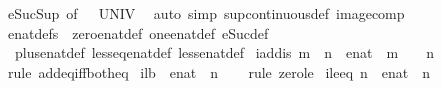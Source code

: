 \begin{isabellebody}
\ eSuc{\isacharunderscore}Sup\ {\isacharbrackleft}of\ {\isachardoublequoteopen}{\isacharunderscore}\ {\isacharbackquote}\ UNIV{\isachardoublequoteclose}{\isacharbrackright}\ \isamarkupfalse%
\ {\isacharparenleft}auto\ simp{\isacharcolon}\ sup{\isacharunderscore}continuous{\isacharunderscore}def\ image{\isacharunderscore}comp{\isacharparenright}%
\endisatagproof
{\isafoldproof}%
%
\isadelimproof
%
\endisadelimproof
%
\isadelimdocument
%
\endisadelimdocument
%
\isatagdocument
%
\isamarkuptrue%
%
\endisatagdocument
{\isafolddocument}%
%
\isadelimdocument
%
\endisadelimdocument
{}\isamarkupfalse%
\ enat{\isacharunderscore}defs\ {\isacharequal}\ zero{\isacharunderscore}enat{\isacharunderscore}def\ one{\isacharunderscore}enat{\isacharunderscore}def\ eSuc{\isacharunderscore}def\isanewline
\ \ plus{\isacharunderscore}enat{\isacharunderscore}def\ less{\isacharunderscore}eq{\isacharunderscore}enat{\isacharunderscore}def\ less{\isacharunderscore}enat{\isacharunderscore}def\isanewline
\isanewline
{}\isamarkupfalse%
\ iadd{\isacharunderscore}is{\isacharunderscore}{}{\isacharcolon}\ {\isachardoublequoteopen}{\isacharparenleft}m\ {\isacharplus}\ n\ {\isacharequal}\ {\isacharparenleft}{}{\isacharcolon}{\isacharcolon}enat{\isacharparenright}{\isacharparenright}\ {\isacharequal}\ {\isacharparenleft}m\ {\isacharequal}\ {}\ {\isasymand}\ n\ {\isacharequal}\ {}{\isacharparenright}{\isachardoublequoteclose}\isanewline
%
\isadelimproof
\ \ %
\endisadelimproof
%
\isatagproof
{}\isamarkupfalse%
\ {\isacharparenleft}rule\ add{\isacharunderscore}eq{\isacharunderscore}{}{\isacharunderscore}iff{\isacharunderscore}both{\isacharunderscore}eq{\isacharunderscore}{}{\isacharparenright}%
\endisatagproof
{\isafoldproof}%
%
\isadelimproof
\isanewline
%
\endisadelimproof
\isanewline
{}\isamarkupfalse%
\ i{}{\isacharunderscore}lb\ {\isacharcolon}\ {\isachardoublequoteopen}{\isacharparenleft}{}{\isacharcolon}{\isacharcolon}enat{\isacharparenright}\ {\isasymle}\ n{\isachardoublequoteclose}\isanewline
%
\isadelimproof
\ \ %
\endisadelimproof
%
\isatagproof
{}\isamarkupfalse%
\ {\isacharparenleft}rule\ zero{\isacharunderscore}le{\isacharparenright}%
\endisatagproof
{\isafoldproof}%
%
\isadelimproof
\isanewline
%
\endisadelimproof
\isanewline
{}\isamarkupfalse%
\ ile{}{\isacharunderscore}eq{\isacharcolon}\ {\isachardoublequoteopen}n\ {\isasymle}\ {\isacharparenleft}{}{\isacharcolon}{\isacharcolon}enat{\isacharparenright}\ {\isasymlongleftrightarrow}\ n\ {\isacharequal}\ {}{\isachardoublequoteclose}\isanewline

\end{isabellebody}
